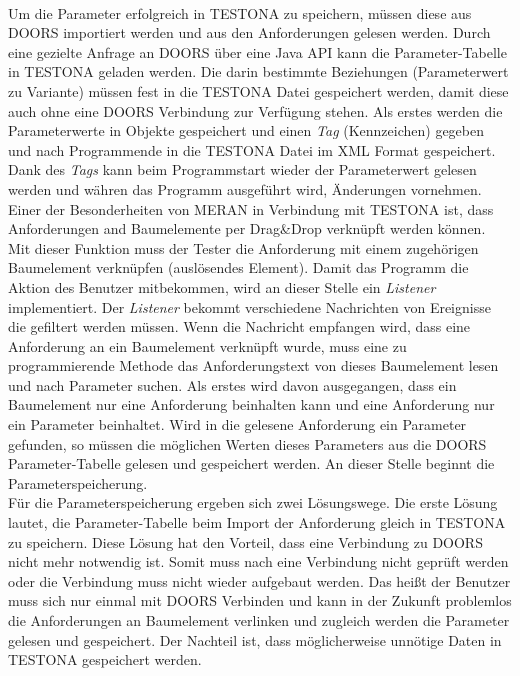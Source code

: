 \paragraph{}
 
Um die Parameter erfolgreich in TESTONA zu speichern, müssen diese aus DOORS importiert werden und aus den Anforderungen gelesen werden. Durch eine gezielte Anfrage an DOORS über eine Java API kann die Parameter-Tabelle in TESTONA geladen werden. Die darin bestimmte Beziehungen (Parameterwert zu Variante) müssen fest in die TESTONA Datei gespeichert werden, damit diese auch ohne eine DOORS Verbindung zur Verfügung stehen. Als erstes werden die Parameterwerte in Objekte gespeichert und einen \textit{Tag} (Kennzeichen) gegeben und nach Programmende in die TESTONA Datei im XML Format gespeichert. Dank des \textit{Tags} kann beim Programmstart wieder der Parameterwert gelesen werden und währen das Programm ausgeführt wird, Änderungen vornehmen.\\

Einer der Besonderheiten von MERAN in Verbindung mit TESTONA ist, dass Anforderungen and Baumelemente per Drag\&Drop verknüpft werden können. Mit dieser Funktion muss der Tester die Anforderung mit einem zugehörigen Baumelement verknüpfen (auslösendes Element). Damit das Programm die Aktion des Benutzer mitbekommen, wird an dieser Stelle ein \textit{Listener} implementiert. Der \textit{Listener} bekommt verschiedene Nachrichten von Ereignisse die gefiltert werden müssen. Wenn die Nachricht empfangen wird, dass eine Anforderung an ein Baumelement verknüpft wurde, muss eine zu programmierende Methode das Anforderungstext von dieses Baumelement lesen und nach Parameter suchen. Als erstes wird davon ausgegangen, dass ein Baumelement nur eine Anforderung beinhalten kann und eine Anforderung nur ein Parameter beinhaltet. Wird in die gelesene Anforderung ein Parameter gefunden, so müssen die möglichen Werten dieses Parameters aus die DOORS Parameter-Tabelle gelesen und gespeichert werden. An dieser Stelle beginnt die Parameterspeicherung.\\

Für die Parameterspeicherung ergeben sich zwei Lösungswege. Die erste Lösung lautet, die Parameter-Tabelle beim Import der Anforderung gleich in TESTONA zu speichern. Diese Lösung hat den Vorteil, dass eine Verbindung zu DOORS nicht mehr notwendig ist. Somit muss nach eine Verbindung nicht geprüft werden oder die Verbindung muss nicht wieder aufgebaut werden. Das heißt der Benutzer muss sich nur einmal mit DOORS Verbinden und kann in der Zukunft problemlos die Anforderungen an Baumelement verlinken und zugleich werden die Parameter gelesen und gespeichert. Der Nachteil ist, dass möglicherweise unnötige Daten in TESTONA gespeichert werden.\\

